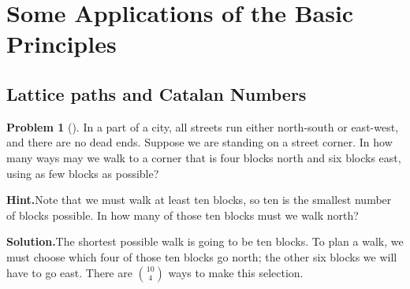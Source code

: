 \documentclass[10pt,]{book}
\theoremstyle{plain}
\theoremstyle{definition}
\newtheorem{activity}[project]{Problem}
\theoremstyle{definition}
\numberwithin{equation}{chapter}
\begin{document}
\section[{Some Applications of the Basic Principles}]{Some Applications of the Basic Principles}\label{section-3}
\typeout{************************************************}
\typeout{************************************************}
\subsection[{Lattice paths and Catalan Numbers}]{Lattice paths and Catalan Numbers}\label{subsection-1}
\begin{activity}[]\label{blockwalking}
In a part of a city, all streets run either north-south or east-west, and there are no dead ends. Suppose we are standing on a street corner. In how many ways may we walk to a corner that is four blocks north and six blocks east, using as few blocks as possible?%
\par\medskip\noindent%
\textbf{Hint.}\quad Note that we must walk at least ten blocks, so ten is the smallest number of blocks possible. In how many of those ten blocks must we walk north?%
\par\medskip\noindent%
\textbf{Solution.}\quad The shortest possible walk is going to be ten blocks. To plan a walk, we must choose which four of those ten blocks go north; the other six blocks we will have to go east. There are \(\binom{10}{4}\) ways to make this selection.%
\end{activity}
\end{document}
